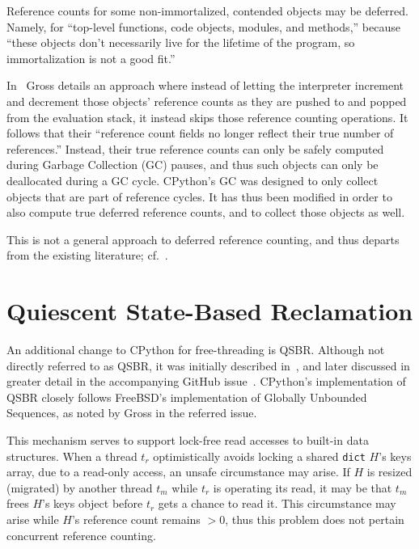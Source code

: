 Reference counts for some non-immortalized, contended objects may be deferred.
Namely, for ``top-level functions, code objects, modules, and methods,'' because ``these objects don't necessarily live for the lifetime of the program, so immortalization is not a good fit.''

In~\cite[\S Deferred Reference Counting]{pep703} Gross details an approach where instead of letting the interpreter increment and decrement those objects' reference counts as they are pushed to and popped from the evaluation stack, it instead skips those reference counting operations.
It follows that their ``reference count fields no longer reflect their true number of references.''
Instead, their true reference counts can only be safely computed during Garbage Collection (GC) pauses, and thus such objects can only be deallocated during a GC cycle.
CPython's GC was designed to only collect objects that are part of reference cycles.
It has thus been modified in order to also compute true deferred reference counts, and to collect those objects as well.

This is not a general approach to deferred reference counting, and thus departs from the existing literature; cf.~\cite{deferred-refcounting}.


\section{Quiescent State-Based Reclamation}\label{sec:qsbr}

An additional change to CPython for free-threading is QSBR\@.
Although not directly referred to as QSBR, it was initially described in~\cite[\S Mimalloc Page Reuse]{pep703}, and later discussed in greater detail in the accompanying GitHub issue~\cite{qsbr}.
CPython's implementation of QSBR closely follows FreeBSD's implementation of Globally Unbounded Sequences, as noted by Gross in the referred issue.

This mechanism serves to support lock-free read accesses to built-in data structures.
When a thread $t_r$ optimistically avoids locking a shared \texttt{dict} $H$'s keys array, due to a read-only access, an unsafe circumstance may arise.
If $H$ is resized (migrated) by another thread $t_m$ while $t_r$ is operating its read, it may be that $t_m$ frees $H$'s keys object before $t_r$ gets a chance to read it.
This circumstance may arise while $H$'s reference count remains $> 0$, thus this problem does not pertain concurrent reference counting.

